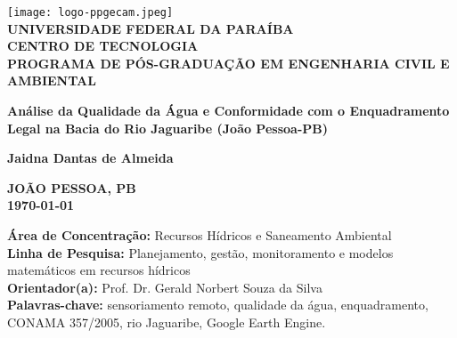 \documentclass[12pt, a4paper]{article}
\begin{document}
    \begin{titlepage}
        \centering
        \vspace*{0.5cm}
        \texttt{[image: logo-ppgecam.jpeg]}\\[0.2cm]
        \vspace*{0.5cm}
        \textbf{\small UNIVERSIDADE FEDERAL DA PARAÍBA \\
        CENTRO DE TECNOLOGIA \\
        PROGRAMA DE PÓS-GRADUAÇÃO EM ENGENHARIA CIVIL E AMBIENTAL}
        \vspace{3cm}
        
        \textbf{\Huge Análise da Qualidade da Água e Conformidade com o Enquadramento Legal na Bacia do Rio Jaguaribe (João Pessoa-PB)}
        \vspace{3cm}
        
        \textbf{\large Jaidna Dantas de Almeida}
        \vfill
        
        \textbf{JOÃO PESSOA, PB \\ \today}
    \end{titlepage}

    \begin{center}
        \textbf{Área de Concentração:} Recursos Hídricos e Saneamento Ambiental \\
        \textbf{Linha de Pesquisa:} Planejamento, gestão, monitoramento e modelos matemáticos em recursos hídricos \\
        \textbf{Orientador(a):} Prof. Dr. Gerald Norbert Souza da Silva \\
        \textbf{Palavras-chave:} sensoriamento remoto, qualidade da água, enquadramento, CONAMA 357/2005, rio Jaguaribe, Google Earth Engine.
    \end{center}

    \newpage

\end{document}
